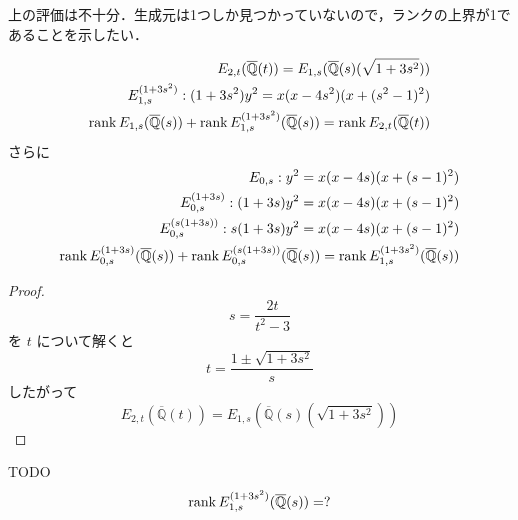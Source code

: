 \documentclass[main]{subfiles}
\begin{document}
上の評価は不十分．生成元は1つしか見つかっていないので，ランクの上界が1であることを示したい．
\begin{thm}
    \begin{align}
        E_{2,t}(\overline{\mathbb{Q}}(t)) = E_{1,s}(\overline{\mathbb{Q}}(s)(\sqrt{1 + 3s^{2}})) \\
        E_{1,s}^{(1 + 3s^{2})}: (1 + 3s^{2}) y^{2} = x(x - 4s^{2})(x + (s^{2} - 1)^{2})          \\
        \operatorname{rank} E_{1,s}(\overline{\mathbb{Q}}(s)) + \operatorname{rank} E_{1,s}^{(1 + 3s^{2})}(\overline{\mathbb{Q}}(s)) = \operatorname{rank} E_{2,t}(\overline{\mathbb{Q}}(t))
    \end{align}
    さらに
    \begin{align}
        E_{0,s}: y^{2} = x(x - 4s)(x + (s - 1)^{2})                         \\
        E_{0,s}^{(1 + 3s)}: (1 + 3s) y^{2} = x(x - 4s)(x + (s - 1)^{2})     \\
        E_{0,s}^{(s(1 + 3s))}: s(1 + 3s) y^{2} = x(x - 4s)(x + (s - 1)^{2}) \\
        \operatorname{rank} E_{0,s}^{(1 + 3s)}(\overline{\mathbb{Q}}(s)) + \operatorname{rank} E_{0,s}^{(s(1 + 3s))}(\overline{\mathbb{Q}}(s)) = \operatorname{rank} E_{1,s}^{(1 + 3s^{2})}(\overline{\mathbb{Q}}(s))
    \end{align}
\end{thm}
\begin{proof}
    \begin{equation}
        s = \frac{2t}{t^{2} - 3}
    \end{equation}
    を $t$ について解くと
    \begin{equation}
        t = \frac{1 \pm \sqrt{1 + 3s^{2}}}{s}
    \end{equation}
    したがって
    \begin{equation}
        E_{2,t}(\overline{\mathbb{Q}}(t)) = E_{1,s}(\overline{\mathbb{Q}}(s)(\sqrt{1 + 3s^{2}}))
    \end{equation}
\end{proof}

\begin{thm}
    TODO
    \begin{equation}
        \operatorname{rank} E_{1,s}^{(1 + 3s^{2})}(\overline{\mathbb{Q}}(s)) = ?
    \end{equation}
\end{thm}
\end{document}
